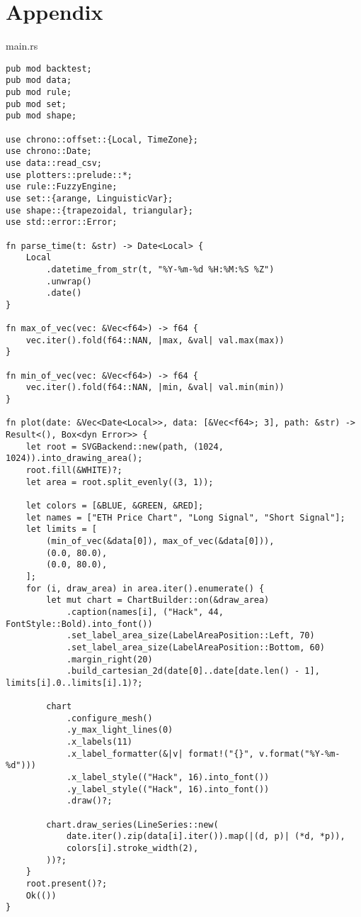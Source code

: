 
\section*{Appendix}
\noindent main.rs
\begin{verbatim}
pub mod backtest;
pub mod data;
pub mod rule;
pub mod set;
pub mod shape;

use chrono::offset::{Local, TimeZone};
use chrono::Date;
use data::read_csv;
use plotters::prelude::*;
use rule::FuzzyEngine;
use set::{arange, LinguisticVar};
use shape::{trapezoidal, triangular};
use std::error::Error;

fn parse_time(t: &str) -> Date<Local> {
    Local
        .datetime_from_str(t, "%Y-%m-%d %H:%M:%S %Z")
        .unwrap()
        .date()
}

fn max_of_vec(vec: &Vec<f64>) -> f64 {
    vec.iter().fold(f64::NAN, |max, &val| val.max(max))
}

fn min_of_vec(vec: &Vec<f64>) -> f64 {
    vec.iter().fold(f64::NAN, |min, &val| val.min(min))
}

fn plot(date: &Vec<Date<Local>>, data: [&Vec<f64>; 3], path: &str) -> Result<(), Box<dyn Error>> {
    let root = SVGBackend::new(path, (1024, 1024)).into_drawing_area();
    root.fill(&WHITE)?;
    let area = root.split_evenly((3, 1));

    let colors = [&BLUE, &GREEN, &RED];
    let names = ["ETH Price Chart", "Long Signal", "Short Signal"];
    let limits = [
        (min_of_vec(&data[0]), max_of_vec(&data[0])),
        (0.0, 80.0),
        (0.0, 80.0),
    ];
    for (i, draw_area) in area.iter().enumerate() {
        let mut chart = ChartBuilder::on(&draw_area)
            .caption(names[i], ("Hack", 44, FontStyle::Bold).into_font())
            .set_label_area_size(LabelAreaPosition::Left, 70)
            .set_label_area_size(LabelAreaPosition::Bottom, 60)
            .margin_right(20)
            .build_cartesian_2d(date[0]..date[date.len() - 1], limits[i].0..limits[i].1)?;

        chart
            .configure_mesh()
            .y_max_light_lines(0)
            .x_labels(11)
            .x_label_formatter(&|v| format!("{}", v.format("%Y-%m-%d")))
            .x_label_style(("Hack", 16).into_font())
            .y_label_style(("Hack", 16).into_font())
            .draw()?;

        chart.draw_series(LineSeries::new(
            date.iter().zip(data[i].iter()).map(|(d, p)| (*d, *p)),
            colors[i].stroke_width(2),
        ))?;
    }
    root.present()?;
    Ok(())
}


\end{verbatim}
